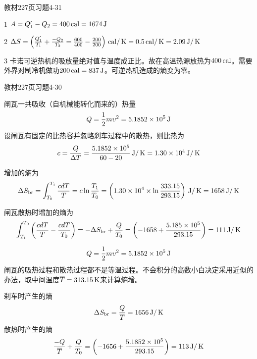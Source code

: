 \documentclass[CJK]{beamer}
\begin{document}


\begin{frame}
  \bch
  教材227页习题4-31
  \ech
\end{frame}


\begin{frame}
  \bch
  {\small
    \bitem
  \item[1]{$A = Q_1'-Q_2  = 400\,\mathrm{cal} = 1674\,\mathrm{J}$}
  \item[2]{$\Delta S = \left(\frac{Q_1'}{T_1}+\frac{-Q_2}{T_2} = \frac{600}{400}-\frac{200}{200}\right)\,\mathrm{cal}/\,\mathrm{K} = 0.5\,\mathrm{cal}/\,\mathrm{K} = 2.09\,\mathrm{J}/\,\mathrm{K}$}
  \item[3]{卡诺可逆热机的吸放量绝对值与温度成正比。故在高温热源放热为$400\,\mathrm{cal}$。需要外界对制冷机做功$200\,\mathrm{cal} = 837\,\mathrm{J}$。可逆热机造成的熵变为零。}
  \eitem
  }
  \ech
\end{frame}

\begin{frame}
  \bch
  教材227页习题4-30
  \ech
\end{frame}


\begin{frame}
  \bch
  {\small
  闸瓦一共吸收（自机械能转化而来的）热量
  $$Q  = \frac{1}{2}m\upsilon^2 = 5.1852\times 10^5 \,\mathrm{J}$$
  设闸瓦有固定的比热容并忽略刹车过程中的散热，则比热为
  $$ c = \frac{Q}{\Delta T} = \frac{5.1852\times 10^5}{60-20}\,\mathrm{J}/\,\mathrm{K} = 1.30\times 10^4 \,\mathrm{J}/\,\mathrm{K}$$
  
  增加的熵为
  $$ \Delta S_{\rm br} = \int_{T_0}^{T_1} \frac{c dT}{T} = c\ln\frac{T_1}{T_0} = \left(1.30\times 10^4 \times \ln\frac{333.15}{293.15}\right) \,\mathrm{J}/\,\mathrm{K} = 1658 \,\mathrm{J}/\,\mathrm{K}$$

  闸瓦散热时增加的熵为
  $$\int_{T_1}^{T_0} \left(\frac{cdT}{T} -\frac{cdT}{T_0} \right) = -\Delta S_{\rm br} + \frac{Q}{T_0} = \left(-1658 + \frac{5.185\times 10^5}{293.15}\right) = 111 \,\mathrm{J}/\,\mathrm{K}$$
  
  }
  \ech
\end{frame}


\begin{frame}
  \bch
      {\small
        $$Q  = \frac{1}{2}m\upsilon^2 = 5.1852\times 10^5 \,\mathrm{J}$$
        闸瓦的吸热过程和散热过程都不是等温过程。不会积分的高数小白决定采用近似的办法，取中间温度$\overline{T} = 313.15\,\mathrm{K}$来计算熵增。
        
        刹车时产生的熵
        $$ \Delta S_{\rm br} = \frac{Q}{\overline{T}} = 1656 \,\mathrm{J}/\,\mathrm{K}$$
        散热时产生的熵
        $$ \frac{-Q}{\overline{T}} + \frac{Q}{T_0} =   \left(-1656 + \frac{5.1852\times 10^5}{293.15}\right) = 113 \,\mathrm{J}/\,\mathrm{K} $$
        
  }
  \ech
\end{frame}
\end{document}
